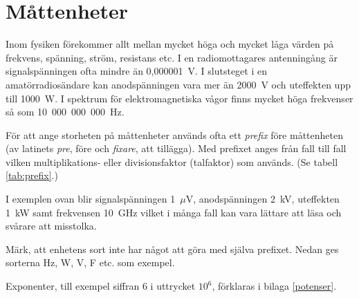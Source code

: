 \chapter{Måttenheter}

  Inom fysiken förekommer allt mellan mycket höga och mycket låga
  värden på frekvens, spänning, ström, resistans etc.
  I en radiomottagares antenningång är signalspänningen ofta mindre än
  0,000001~V.
  I slutsteget i en amatörradiosändare kan anodspänningen vara mer än 2000~V
  och uteffekten upp till 1000~W.
  I spektrum för elektromagnetiska vågor finns mycket höga frekvenser
  så som 10~000~000~000~Hz.

  För att ange storheten på måttenheter används ofta ett \emph{prefix} före
  måttenheten (av latinets \emph{pre}, före och \emph{fixare}, att tillägga).
  Med prefixet anges från fall till fall vilken multiplikations- eller
  divisionsfaktor (talfaktor) som används. (Se tabell \ref{tab:prefix}.)

  I exemplen ovan blir signalspänningen 1~\(\mu\)V, anodspänningen 2~kV,
  uteffekten 1~kW samt frekvensen 10~GHz vilket i många fall kan vara lättare
  att läsa och svårare att misstolka.

  Märk, att enhetens sort inte har något att göra med själva prefixet.
  Nedan ges sorterna Hz, W, V, F etc. som exempel.

  Exponenter, till exempel siffran 6 i uttrycket \(10^6\), förklaras i
  bilaga \ref{potenser}.

